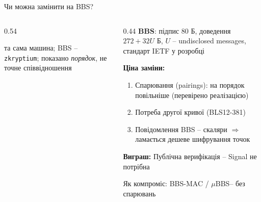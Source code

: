 \documentclass[aspectratio=169, 10pt, xcolor=svgnames]{beamer}
\begin{document}

\begin{frame}{Чи можна замінити на BBS?}
  \begin{columns}[T]
    \begin{column}{0.54\textwidth}
      \centering
      \resizebox{\linewidth}{!}{}\par
      \scriptsize та сама машина; BBS -- \texttt{zkryptium}\footnotemark[1]; показано \emph{порядок}, не точне
      співвідношення
    \end{column}
    \begin{column}{0.44\textwidth}
      \small
      \textbf{BBS}\footnotemark[2]: підпис 80 Б, доведення $272 + 32U$ Б, $U$ -- undisclosed messages, стандарт 
      IETF у розробці\par\medskip
      \textbf{Ціна заміни:}
      \begin{enumerate}
        \item Спарювання (pairings): на порядок повільніше (перевірено реалізацією)
        \item Потреба другої кривої (BLS12-381)
        \item \alert{Повідомлення BBS -- скаляри} $\Rightarrow$ ламається дешеве шифрування точок
      \end{enumerate}
      \textbf{Виграш:} Публічна верифікація -- Signal не потрібна\par\medskip
      Як компроміс: BBS-MAC / $\mu$BBS\footnotemark[3] -- без спарювань
    \end{column}
  \end{columns}
\end{frame}

\end{document}
